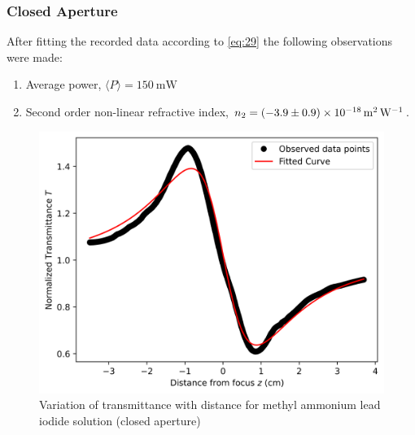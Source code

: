 \documentclass[%
 reprint,
 amsmath,amssymb,
 aps,
]{revtex4-2}
\begin{document}
		\subsubsection{Closed Aperture}
		After fitting the recorded data according to \eqref{eq:29} the following observations were made:
		\begin{enumerate} 
			\item Average power, $ \langle P \rangle  = \SI{150}{\milli \watt}$
			\item Second order non-linear refractive index, $ n_2 = \SI[separate-uncertainty=true]{-3.9 \pm 0.9e-18}{\meter \squared \per \watt} $.
		\end{enumerate}
		\begin{figure}
			\includegraphics[scale = 0.59]{satyl-c}
			\caption{Variation of transmittance with distance for methyl ammonium lead iodide solution (closed aperture)}
		\end{figure}
		
\end{document}
